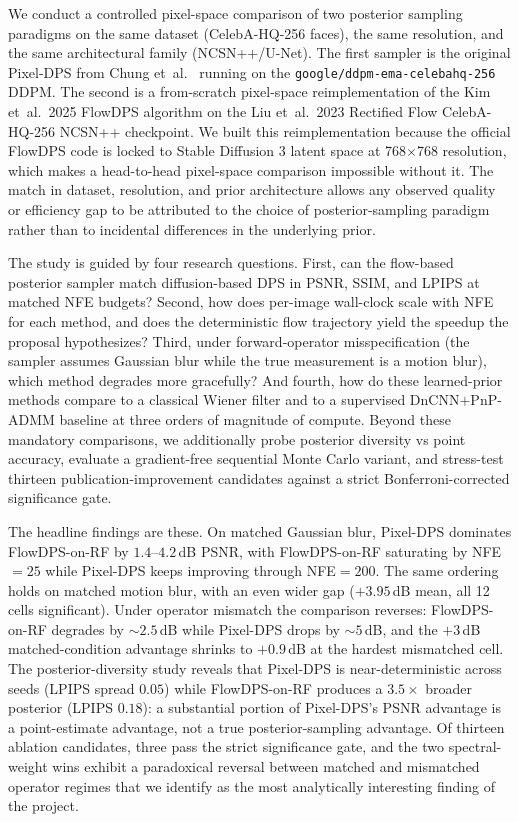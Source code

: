 \documentclass{article}
\begin{document}
We conduct a controlled pixel-space comparison of two posterior
sampling paradigms on the same dataset (CelebA-HQ-256 faces), the same
resolution, and the same architectural family (NCSN++/U-Net). The first
sampler is the original Pixel-DPS from Chung et~al.~\citep{chung2023dps}
running on the \texttt{google/ddpm-ema-celebahq-256} DDPM. The second is
a from-scratch pixel-space reimplementation of the Kim et~al.~2025
FlowDPS algorithm on the Liu et~al.~2023 Rectified Flow CelebA-HQ-256
NCSN++ checkpoint. We built this reimplementation because the official
FlowDPS code is locked to Stable Diffusion 3 latent space at 768$\times$768
resolution, which makes a head-to-head pixel-space comparison
impossible without it. The match in dataset, resolution, and prior
architecture allows any observed quality or efficiency gap to be
attributed to the choice of posterior-sampling paradigm rather than to
incidental differences in the underlying prior.

The study is guided by four research questions. First, can the
flow-based posterior sampler match diffusion-based DPS in PSNR, SSIM,
and LPIPS at matched NFE budgets? Second, how does per-image wall-clock
scale with NFE for each method, and does the deterministic flow
trajectory yield the speedup the proposal hypothesizes? Third, under
forward-operator misspecification (the sampler assumes Gaussian blur
while the true measurement is a motion blur), which method degrades
more gracefully? And fourth, how do these learned-prior methods compare
to a classical Wiener filter and to a supervised DnCNN$+$PnP-ADMM
baseline at three orders of magnitude of compute. Beyond these
mandatory comparisons, we additionally probe posterior diversity vs
point accuracy, evaluate a gradient-free sequential Monte Carlo
variant, and stress-test thirteen publication-improvement candidates
against a strict Bonferroni-corrected significance gate.

The headline findings are these. On matched Gaussian blur, Pixel-DPS
dominates FlowDPS-on-RF by $1.4$--$4.2$\,dB PSNR, with FlowDPS-on-RF
saturating by NFE${=}25$ while Pixel-DPS keeps improving through
NFE${=}200$. The same ordering holds on matched motion blur, with an
even wider gap ($+3.95$\,dB mean, all 12 cells significant). Under
operator mismatch the comparison reverses: FlowDPS-on-RF degrades by
$\sim2.5$\,dB while Pixel-DPS drops by $\sim 5$\,dB, and the
$+3$\,dB matched-condition advantage shrinks to $+0.9$\,dB at the
hardest mismatched cell. The posterior-diversity study reveals that
Pixel-DPS is near-deterministic across seeds (LPIPS spread $0.05$)
while FlowDPS-on-RF produces a $3.5\times$ broader posterior
(LPIPS $0.18$): a substantial portion of Pixel-DPS's PSNR advantage is
a point-estimate advantage, not a true posterior-sampling advantage.
Of thirteen ablation candidates, three pass the strict significance
gate, and the two spectral-weight wins exhibit a paradoxical reversal
between matched and mismatched operator regimes that we identify as
the most analytically interesting finding of the project.
\end{document}
